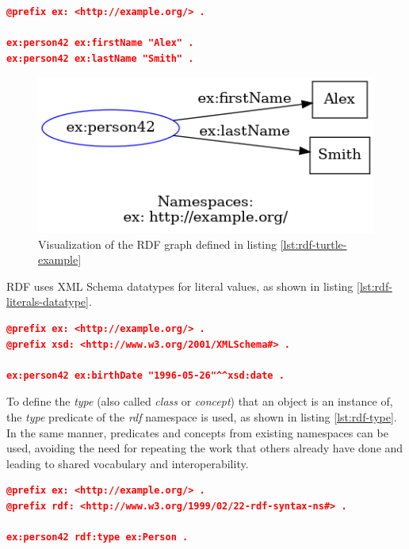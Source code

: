 \begin{lstlisting}[language=json,basicstyle=\scriptsize,firstnumber=1,caption={RDF Graph in Turtle syntax},captionpos=b,label={lst:rdf-turtle-example}]
@prefix ex: <http://example.org/> .

ex:person42 ex:firstName "Alex" .
ex:person42 ex:lastName "Smith" .
\end{lstlisting}


\begin{figure}[!t]
    \centering
    \includegraphics[width=\columnwidth]{figures/rdf_graph_example}
    \caption{Visualization of the RDF graph defined in listing \ref{lst:rdf-turtle-example}}
    \label{fig:rdf_graph}
\end{figure}

RDF uses XML Schema datatypes for literal values, as shown in listing \ref{lst:rdf-literals-datatype}.


\begin{lstlisting}[language=json,basicstyle=\scriptsize,firstnumber=1,caption={Usage of XML Schema datatypes for literals in RDF},captionpos=b,label={lst:rdf-literals-datatype}]
@prefix ex: <http://example.org/> .
@prefix xsd: <http://www.w3.org/2001/XMLSchema#> .

ex:person42 ex:birthDate "1996-05-26"^^xsd:date .
\end{lstlisting}

To define the \textit{type} (also called \textit{class} or \textit{concept}) that an object is an instance of, the \textit{type} predicate of the \textit{rdf} namespace is used, as shown in listing \ref{lst:rdf-type}.
In the same manner, predicates and concepts from existing namespaces can be used, avoiding the need for repeating the work that others already have done and leading to shared vocabulary and interoperability.

\begin{lstlisting}[language=json,basicstyle=\scriptsize,firstnumber=1,caption={Type definition in RDF},captionpos=b,label={lst:rdf-type}]
@prefix ex: <http://example.org/> .
@prefix rdf: <http://www.w3.org/1999/02/22-rdf-syntax-ns#> .

ex:person42 rdf:type ex:Person .
\end{lstlisting}

